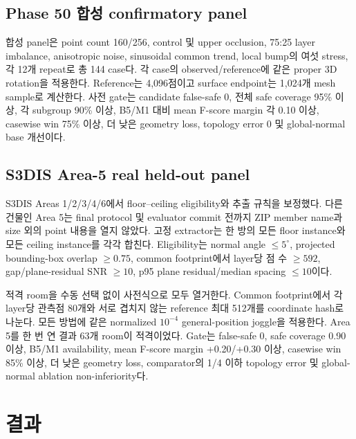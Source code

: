 \documentclass[12pt,a4paper]{article}
\begin{document}
\subsection{Phase 50 합성 confirmatory panel}

합성 panel은 point count 160/256, control 및 upper occlusion, 75:25 layer
imbalance, anisotropic noise, sinusoidal common trend, local bump의 여섯 stress,
각 12개 repeat로 총 144 case다. 각 case의 observed/reference에 같은 proper
3D rotation을 적용한다. Reference는 4,096점이고 surface endpoint는 1,024개
mesh sample로 계산한다. 사전 gate는 candidate false-safe 0, 전체 safe
coverage 95\% 이상, 각 subgroup 90\% 이상, B5/M1 대비 mean F-score margin
각 0.10 이상, casewise win 75\% 이상, 더 낮은 geometry loss, topology error
0 및 global-normal base 개선이다.

\subsection{S3DIS Area-5 real held-out panel}

S3DIS Areas 1/2/3/4/6에서 floor--ceiling eligibility와 추출 규칙을
보정했다. 다른 건물인 Area 5는 final protocol 및 evaluator commit 전까지
ZIP member name과 size 외의 point 내용을 열지 않았다. 고정 extractor는 한
방의 모든 floor instance와 모든 ceiling instance를 각각 합친다.
Eligibility는 normal angle $\leq5^{\circ}$, projected bounding-box overlap
$\geq0.75$, common footprint에서 layer당 점 수 $\geq592$, gap/plane-residual
SNR $\geq10$, p95 plane residual/median spacing $\leq10$이다.

적격 room을 수동 선택 없이 사전식으로 모두 열거한다. Common footprint에서
각 layer당 관측점 80개와 서로 겹치지 않는 reference 최대 512개를 coordinate
hash로 나눈다. 모든 방법에 같은 normalized $10^{-4}$ general-position
joggle을 적용한다. Area 5를 한 번 연 결과 63개 room이 적격이었다. Gate는
false-safe 0, safe coverage 0.90 이상, B5/M1 availability, mean F-score
margin +0.20/+0.30 이상, casewise win 85\% 이상, 더 낮은 geometry loss,
comparator의 1/4 이하 topology error 및 global-normal ablation non-inferiority다.

\section{결과}
\end{document}
